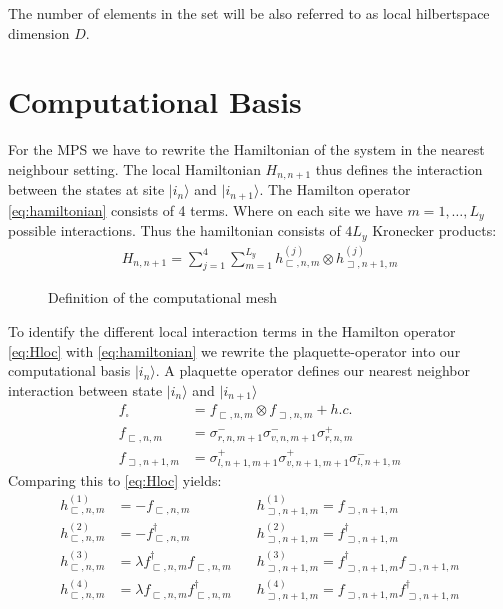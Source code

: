 \documentclass[12pt, a4paper, twoside, titlepage]{article}
\begin{document}
The number of elements in the set will be also referred to as local hilbertspace dimension $D$.

\newpage
\section{Computational Basis}
For the MPS we have to rewrite the Hamiltonian of the system in the nearest neighbour setting.
The local Hamiltonian $H_{n,n+1}$ thus defines the interaction between the states at site
$|i_n\rangle$ and $|i_{n+1}\rangle$.
The Hamilton operator \eqref{eq:hamiltonian} consists of 4 terms. 
Where on each site we have $m=1,\dots,L_y$ possible interactions. 
Thus the hamiltonian consists of $4L_y$ Kronecker products:
\begin{align}
H_{n,n+1}= \sum_{j=1}^4\sum_{m=1}^{L_y}h^{(j)}_{\sqsubset,n,m} \otimes h^{(j)}_{\sqsupset,n+1,m}\label{eq:Hloc}
\end{align}

\begin{figure}[hp!]
  \centering
  
  \caption{Definition of the computational mesh}
  \label{fig:locbasis}
\end{figure}

To identify the different local interaction terms in the Hamilton operator  \eqref{eq:Hloc} with \eqref{eq:hamiltonian} we rewrite the
plaquette-operator into our computational basis $|i_n\rangle$. A plaquette operator defines our nearest neighbor interaction between state
$|i_n\rangle$ and $|i_{n+1}\rangle$
\begin{align}
f_\square &= f_{\sqsubset,n,m}\otimes f_{\sqsupset,n,m} + h.c.\\
f_{\sqsubset,n,m} &= \sigma^-_{r,n,m+1}\sigma^-_{v,n,m+1}\sigma^+_{r,n,m}\\
f_{\sqsupset,n+1,m} &= \sigma^+_{l,n+1,m+1}\sigma^+_{v,n+1,m+1}\sigma^-_{l,n+1,m}
\end{align}
Comparing this to \eqref{eq:Hloc} yields:
\begin{align}
h^{(1)}_{\sqsubset,n,m} &=- f_{\sqsubset,n,m}\quad
&h^{(1)}_{\sqsupset,n+1,m} = f_{\sqsupset,n+1,m}\\
h^{(2)}_{\sqsubset,n,m} &=- f^\dagger_{\sqsubset,n,m}
\quad
&h^{(2)}_{\sqsupset,n+1,m} = f^\dagger_{\sqsupset,n+1,m}\\
h^{(3)}_{\sqsubset,n,m} &=\lambda f^\dagger_{\sqsubset,n,m}f_{\sqsubset,n,m}
\quad
&h^{(3)}_{\sqsupset,n+1,m} = f^\dagger_{\sqsupset,n+1,m}f_{\sqsupset,n+1,m}\\
h^{(4)}_{\sqsubset,n,m} &=
\lambda f_{\sqsubset,n,m}f^\dagger_{\sqsubset,n,m}
\quad
&h^{(4)}_{\sqsupset,n+1,m} =
f_{\sqsupset,n+1,m}f^\dagger_{\sqsupset,n+1,m}\\
\end{align}
\end{document}
